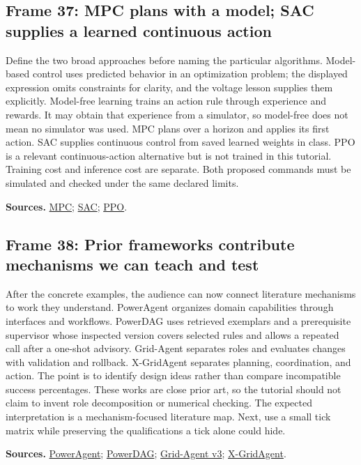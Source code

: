 \documentclass[11pt]{article}
\begin{document}
\subsection*{Frame 37: MPC plans with a model; SAC supplies a learned continuous action}
Define the two broad approaches before naming the particular algorithms. Model-based control uses predicted behavior in an optimization problem; the displayed expression omits constraints for clarity, and the voltage lesson supplies them explicitly. Model-free learning trains an action rule through experience and rewards. It may obtain that experience from a simulator, so model-free does not mean no simulator was used. MPC plans over a horizon and applies its first action. SAC supplies continuous control from saved learned weights in class. PPO is a relevant continuous-action alternative but is not trained in this tutorial. Training cost and inference cost are separate. Both proposed commands must be simulated and checked under the same declared limits.\par
\par\nopagebreak\begin{minipage}{\linewidth}{\footnotesize\color{slate}\textbf{Sources.} \href{https://sites.engineering.ucsb.edu/~jbraw/mpc/}{MPC}; \href{https://proceedings.mlr.press/v80/haarnoja18b.html}{SAC}; \href{https://arxiv.org/abs/1707.06347}{PPO}.\par}\end{minipage}\par\medskip
\subsection*{Frame 38: Prior frameworks contribute mechanisms we can teach and test}
After the concrete examples, the audience can now connect literature mechanisms to work they understand. PowerAgent organizes domain capabilities through interfaces and workflows. PowerDAG uses retrieved exemplars and a prerequisite supervisor whose inspected version covers selected rules and allows a repeated call after a one-shot advisory. Grid-Agent separates roles and evaluates changes with validation and rollback. X-GridAgent separates planning, coordination, and action. The point is to identify design ideas rather than compare incompatible success percentages. These works are close prior art, so the tutorial should not claim to invent role decomposition or numerical checking. The expected interpretation is a mechanism-focused literature map. Next, use a small tick matrix while preserving the qualifications a tick alone could hide.\par
\par\nopagebreak\begin{minipage}{\linewidth}{\footnotesize\color{slate}\textbf{Sources.} \href{https://poweragent.seas.harvard.edu/}{PowerAgent}; \href{https://arxiv.org/html/2603.17418v1}{PowerDAG}; \href{https://arxiv.org/html/2508.05702v3}{Grid-Agent v3}; \href{https://arxiv.org/html/2512.20789v1}{X-GridAgent}.\par}\end{minipage}\par\medskip
\end{document}
